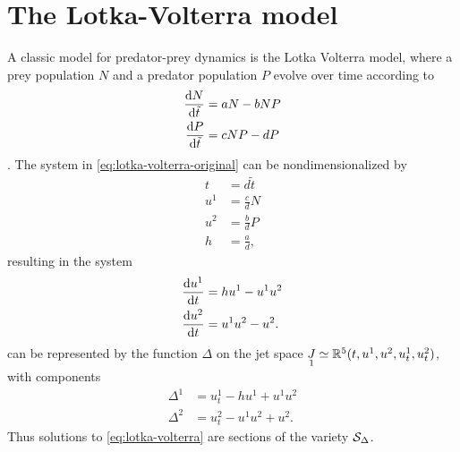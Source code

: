 \chapter{The Lotka-Volterra model}

A classic model for predator-prey dynamics is the Lotka Volterra model, where a prey population \(N\) and a predator population \(P\) evolve over time according to
\begin{subequations}
  \label{eq:lotka-volterra-original}  
  \begin{align}
    \dv{N}{\tilde{t}} &= a N - b N P\\
    \dv{P}{\tilde{t}} &= c N P - d P
  \end{align}
\end{subequations}
\cite{murray2002biology}.
The system in \cref{eq:lotka-volterra-original} can be nondimensionalized by
\begin{align}
  t &= d \tilde{t}\\
  u^1 &= \frac{c}{d} N\\
  u^2 &= \frac{b}{d} P\\
  h &= \frac{a}{d},
\end{align}
resulting in the system
\begin{subequations}
  \label{eq:lotka-volterra}  
  \begin{align}
    \dv{u^1}{t} &= h u^1 - u^1 u^2\\
    \dv{u^2}{t} &= u^1 u^2 - u^2.
  \end{align}
\end{subequations}
 can be represented by the function \(\Delta\) on the jet space \(\prolong{J}{1} \simeq \reals^5(t, u^1, u^2, u^1_t, u^2_t)\), with components
\begin{align}
  \Delta^1 &= u^1_t - h u^1 + u^1 u^2 \label{eq:lotka-volterra-delta1}\\
  \Delta^2 &= u^2_t - u^1 u^2 + u^2. \label{eq:lotka-volterra-delta2}
\end{align}
Thus solutions to \cref{eq:lotka-volterra} are sections of the variety \(\variety_\Delta\).


